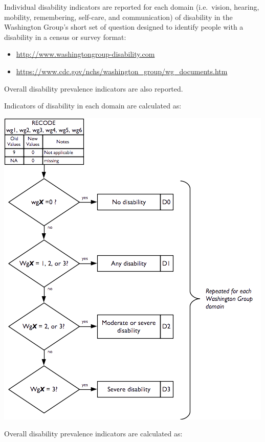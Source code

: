 \documentclass[12pt,a4paper]{book}
\theoremstyle{definition}
\theoremstyle{definition}
\theoremstyle{definition}
\theoremstyle{remark}
\begin{document}
\newpage

Individual disability indicators are reported for each domain
(i.e.~vision, hearing, mobility, remembering, self-care, and
communication) of disability in the Washington Group's short set of
question designed to identify people with a disability in a census or
survey format:

\begin{itemize}
\item
  \url{http://www.washingtongroup-disability.com}
\item
  \url{https://www.cdc.gov/nchs/washington_group/wg_documents.htm}
\end{itemize}

Overall disability prevalence indicators are also reported.

Indicators of disability in each domain are calculated as:

\begin{center}\includegraphics{figures/indicators16} \end{center}

Overall disability prevalence indicators are calculated as:
\end{document}
